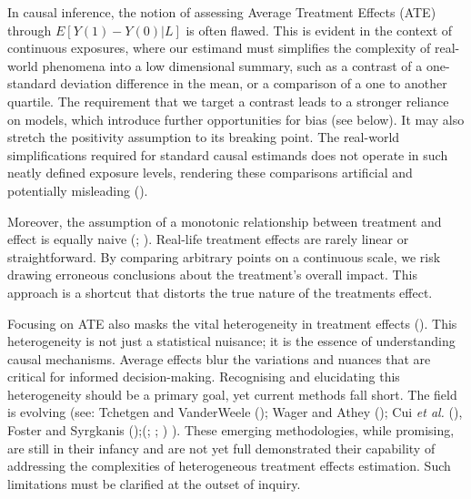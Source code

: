 \documentclass[
  singlecolumn,
  9pt]{article}
\begin{document}
In causal inference, the notion of assessing Average Treatment Effects
(ATE) through \(E[Y(1) - Y(0)|L]\) is often flawed. This is evident in
the context of continuous exposures, where our estimand must simplifies
the complexity of real-world phenomena into a low dimensional summary,
such as a contrast of a one-standard deviation difference in the mean,
or a comparison of a one to another quartile. The requirement that we
target a contrast leads to a stronger reliance on models, which
introduce further opportunities for bias (see below). It may also
stretch the positivity assumption to its breaking point. The real-world
simplifications required for standard causal estimands does not operate
in such neatly defined exposure levels, rendering these comparisons
artificial and potentially misleading
().

Moreover, the assumption of a monotonic relationship between treatment
and effect is equally naive (; ). Real-life treatment effects are rarely linear or
straightforward. By comparing arbitrary points on a continuous scale, we
risk drawing erroneous conclusions about the treatment's overall impact.
This approach is a shortcut that distorts the true nature of the
treatments effect.

Focusing on ATE also masks the vital heterogeneity in treatment effects
(). This heterogeneity is
not just a statistical nuisance; it is the essence of understanding
causal mechanisms. Average effects blur the variations and nuances that
are critical for informed decision-making. Recognising and elucidating
this heterogeneity should be a primary goal, yet current methods fall
short. The field is evolving (see: Tchetgen and VanderWeele
(); Wager and Athey
(); Cui \emph{et al.}
(), Foster and Syrgkanis
();(; ;
) ). These emerging
methodologies, while promising, are still in their infancy and are not
yet full demonstrated their capability of addressing the complexities of
heterogeneous treatment effects estimation. Such limitations must be
clarified at the outset of inquiry.
\end{document}
